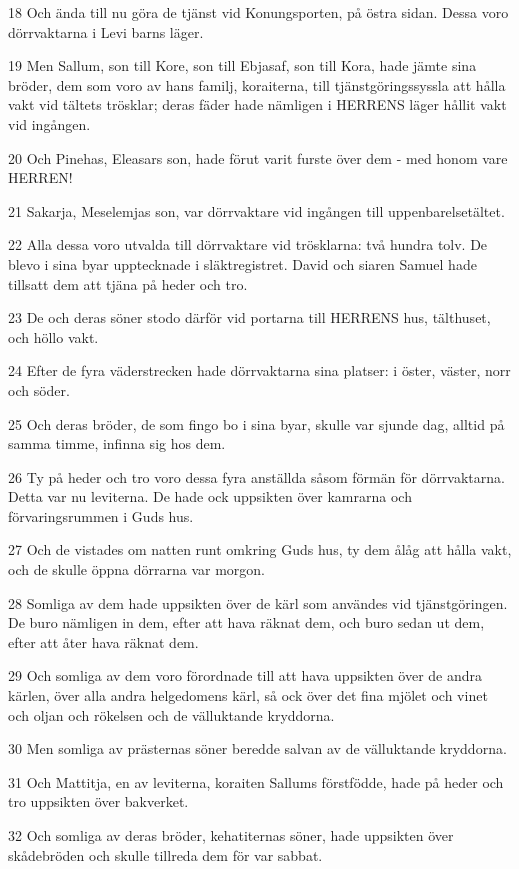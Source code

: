 \par 18 Och ända till nu göra de tjänst vid Konungsporten, på östra sidan. Dessa voro dörrvaktarna i Levi barns läger.
\par 19 Men Sallum, son till Kore, son till Ebjasaf, son till Kora, hade jämte sina bröder, dem som voro av hans familj, koraiterna, till tjänstgöringssyssla att hålla vakt vid tältets trösklar; deras fäder hade nämligen i HERRENS läger hållit vakt vid ingången.
\par 20 Och Pinehas, Eleasars son, hade förut varit furste över dem - med honom vare HERREN!
\par 21 Sakarja, Meselemjas son, var dörrvaktare vid ingången till uppenbarelsetältet.
\par 22 Alla dessa voro utvalda till dörrvaktare vid trösklarna: två hundra tolv. De blevo i sina byar upptecknade i släktregistret. David och siaren Samuel hade tillsatt dem att tjäna på heder och tro.
\par 23 De och deras söner stodo därför vid portarna till HERRENS hus, tälthuset, och höllo vakt.
\par 24 Efter de fyra väderstrecken hade dörrvaktarna sina platser: i öster, väster, norr och söder.
\par 25 Och deras bröder, de som fingo bo i sina byar, skulle var sjunde dag, alltid på samma timme, infinna sig hos dem.
\par 26 Ty på heder och tro voro dessa fyra anställda såsom förmän för dörrvaktarna. Detta var nu leviterna. De hade ock uppsikten över kamrarna och förvaringsrummen i Guds hus.
\par 27 Och de vistades om natten runt omkring Guds hus, ty dem ålåg att hålla vakt, och de skulle öppna dörrarna var morgon.
\par 28 Somliga av dem hade uppsikten över de kärl som användes vid tjänstgöringen. De buro nämligen in dem, efter att hava räknat dem, och buro sedan ut dem, efter att åter hava räknat dem.
\par 29 Och somliga av dem voro förordnade till att hava uppsikten över de andra kärlen, över alla andra helgedomens kärl, så ock över det fina mjölet och vinet och oljan och rökelsen och de välluktande kryddorna.
\par 30 Men somliga av prästernas söner beredde salvan av de välluktande kryddorna.
\par 31 Och Mattitja, en av leviterna, koraiten Sallums förstfödde, hade på heder och tro uppsikten över bakverket.
\par 32 Och somliga av deras bröder, kehatiternas söner, hade uppsikten över skådebröden och skulle tillreda dem för var sabbat.
